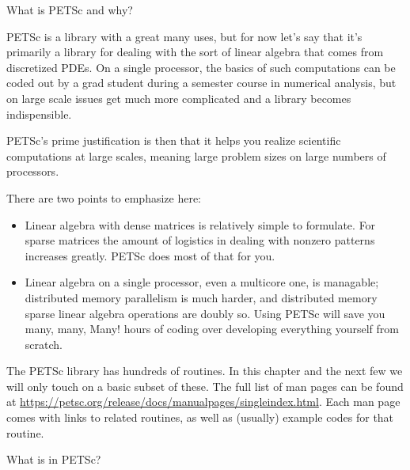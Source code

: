 
 {What is PETSc and why?}

PETSc is a library with a great many uses, but for now let's say that
it's primarily a library for dealing with the sort of linear algebra
that comes from discretized \acp{PDE}. On a single processor, the
basics of such computations 
can be coded out by a grad student during a semester
course in numerical analysis, but on large scale issues get much more
complicated and a library becomes indispensible.

PETSc's prime justification is then that it helps you realize
scientific computations at large scales, meaning large problem sizes
on large numbers of processors.

There are two points to emphasize here:
\begin{itemize}
\item Linear algebra with dense matrices is relatively simple to
  formulate. For sparse matrices the amount of logistics in dealing
  with nonzero patterns increases greatly. PETSc does most of that for
  you.
\item Linear algebra on a single processor, even a multicore one, is
  managable; distributed memory parallelism is much harder, and
  distributed memory sparse linear algebra operations are doubly
  so. Using PETSc will save you many, many, Many! hours of coding over
  developing everything yourself from scratch.
\end{itemize}

\begin{remark}
  The PETSc library has hundreds of routines. In this chapter and the
  next few we will only touch on a basic subset of these. The full
  list of man pages can be found at
  \url{https://petsc.org/release/docs/manualpages/singleindex.html}.
  Each man page comes with links to related routines, as well as (usually)
  example codes for that routine.
\end{remark}

 {What is in PETSc?}

